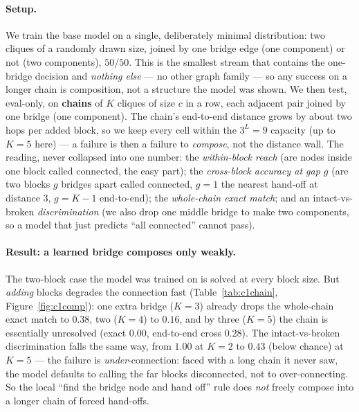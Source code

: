 \documentclass[11pt,a4paper]{article}
\begin{document}
\paragraph{Setup.} We train the base model on a single, deliberately minimal distribution: two cliques
of a randomly drawn size, joined by one bridge edge (one component) or not (two components), $50/50$.
This is the smallest stream that contains the one-bridge decision and \emph{nothing else} --- no other
graph family --- so any success on a longer chain is composition, not a structure the model was shown.
We then test, eval-only, on \textbf{chains} of $K$ cliques of size $c$ in a row, each adjacent pair
joined by one bridge (one component). The chain's end-to-end distance grows by about two hops per added
block, so we keep every cell within the $3^L=9$ capacity (up to $K=5$ here) --- a failure is then a
failure to \emph{compose}, not the distance wall. The reading, never collapsed into one number: the
\emph{within-block reach} (are nodes inside one block called connected, the easy part); the
\emph{cross-block accuracy at gap $g$} (are two blocks $g$ bridges apart called connected, $g=1$ the
nearest hand-off at distance $3$, $g=K{-}1$ end-to-end); the \emph{whole-chain exact match}; and an
intact-vs-broken \emph{discrimination} (we also drop one middle bridge to make two components, so a
model that just predicts ``all connected'' cannot pass).

\paragraph{Result: a learned bridge composes only weakly.} The two-block case the model was trained on
is solved at every block size. But \emph{adding} blocks degrades the connection fast
(Table~\ref{tab:c1chain}, Figure~\ref{fig:c1comp}): one extra bridge ($K=3$) already drops the
whole-chain exact match to $0.38$, two ($K=4$) to $0.16$, and by three ($K=5$) the chain is essentially
unresolved (exact $0.00$, end-to-end cross $0.28$). The intact-vs-broken discrimination falls the same
way, from $1.00$ at $K=2$ to $0.43$ (below chance) at $K=5$ --- the failure is \emph{under}-connection:
faced with a long chain it never saw, the model defaults to calling the far blocks disconnected, not to
over-connecting. So the local ``find the bridge node and hand off'' rule does \emph{not} freely compose
into a longer chain of forced hand-offs.
\end{document}
